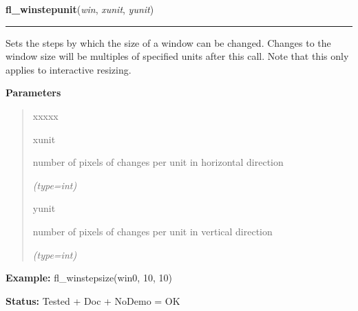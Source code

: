\hspace{.8\funcindent}\begin{boxedminipage}{\funcwidth}

    \raggedright \textbf{fl\_winstepunit}(\textit{win}, \textit{xunit}, \textit{yunit})

    \vspace{-1.5ex}

    \rule{\textwidth}{0.5\fboxrule}
\setlength{\parskip}{2ex}
    Sets the steps by which the size of a window can be changed. Changes to
    the window size will be multiples of specified units after this call. 
    Note that this only applies to interactive resizing.

\setlength{\parskip}{1ex}
      \textbf{Parameters}
      \vspace{-1ex}

      \begin{quote}
        \begin{Ventry}{xxxxx}

          \item[xunit]

          number of pixels of changes per unit in horizontal direction

            {\it (type=int)}

          \item[yunit]

          number of pixels of changes per unit in vertical direction

            {\it (type=int)}

        \end{Ventry}

      \end{quote}

\textbf{Example:} fl\_winstepsize(win0, 10, 10)



\textbf{Status:} Tested + Doc + NoDemo = OK



    \end{boxedminipage}

    \label{xformslib:flxbasic:fl_winstepsize}

    \vspace{0.5ex}


